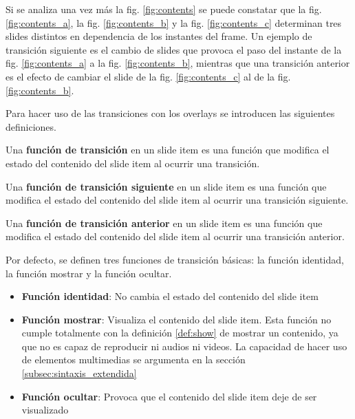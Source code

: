  		Si se analiza una vez más la fig. \ref{fig:contents} se puede constatar que la fig. \ref{fig:contents_a}, la fig. \ref{fig:contents_b} y la fig. \ref{fig:contents_c} determinan tres slides distintos en dependencia de los instantes del frame. Un ejemplo de transición siguiente es el cambio de slides que provoca el paso del instante de la fig. \ref{fig:contents_a} a la fig. \ref{fig:contents_b}, mientras que una transición anterior es el efecto de cambiar el slide de la fig. \ref{fig:contents_c} al de la fig. \ref{fig:contents_b}.


		Para hacer uso de las transiciones con los overlays se introducen las siguientes definiciones.

		\begin{definition}
		\label{def:transition_func}
			Una \textbf{función de transición} en un slide item es una función que modifica el estado del contenido del slide item al ocurrir una transición.
		\end{definition}

		\begin{definition}
		\label{def:next_transition_func}
			Una \textbf{función de transición siguiente} en un slide item es una función que modifica el estado del contenido del slide item al ocurrir una transición siguiente.
		\end{definition}

		\begin{definition}
		\label{def:prev_transition_func}
			Una \textbf{función de transición anterior} en un slide item es una función que modifica el estado del contenido del slide item al ocurrir una transición anterior.
		\end{definition}

		Por defecto, se definen tres funciones de transición básicas: la función identidad, la función mostrar y la función ocultar.
		\begin{itemize}
		\label{it:basic_functions}
			\item \textbf{Función identidad}: No cambia el estado del contenido del slide item
			\item \textbf{Función mostrar}: Visualiza el contenido del slide item. Esta función no cumple totalmente con la definición \ref{def:show} de mostrar un contenido, ya que no es capaz de reproducir ni audios ni videos. La capacidad de hacer uso de elementos multimedias se argumenta en la sección \ref{subsec:sintaxis_extendida} 
			\item \textbf{Función ocultar}: Provoca que el contenido del slide item deje de ser visualizado
		\end{itemize}

